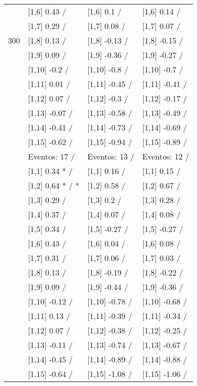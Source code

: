 \begin{table}
\begin{tabular}[t]{llll}
 & {}[1,6] 0.43  / & {}[1,6] 0.1  / & {}[1,6] 0.14  /\\
 & {}[1,7] 0.29  / & {}[1,7] 0.08  / & {}[1,7] 0.07  /\\
300 & {}[1,8] 0.13  / & {}[1,8] -0.13  / & {}[1,8] -0.15  /\\
\addlinespace
 & {}[1,9] 0.09  / & {}[1,9] -0.36  / & {}[1,9] -0.27  /\\
 & {}[1,10] -0.2  / & {}[1,10] -0.8  / & {}[1,10] -0.7  /\\
 & {}[1,11] 0.01  / & {}[1,11] -0.45  / & {}[1,11] -0.41  /\\
 & {}[1,12] 0.07  / & {}[1,12] -0.3  / & {}[1,12] -0.17  /\\
 & {}[1,13] -0.07  / & {}[1,13] -0.58  / & {}[1,13] -0.49  /\\
\addlinespace
 & {}[1,14] -0.41  / & {}[1,14] -0.73  / & {}[1,14] -0.69  /\\
 & {}[1,15] -0.62  / & {}[1,15] -0.94  / & {}[1,15] -0.89  /\\
 & Eventos:  17 / & Eventos:  13 / & Eventos:  12 /\\
 & {}[1,1] 0.34 * / & {}[1,1] 0.16  / & {}[1,1] 0.15  /\\
 & {}[1,2] 0.64 * / * & {}[1,2] 0.58  / & {}[1,2] 0.67  /\\
\addlinespace
 & {}[1,3] 0.29  / & {}[1,3] 0.2  / & {}[1,3] 0.28  /\\
 & {}[1,4] 0.37  / & {}[1,4] 0.07  / & {}[1,4] 0.08  /\\
 & {}[1,5] 0.34  / & {}[1,5] -0.27  / & {}[1,5] -0.27  /\\
 & {}[1,6] 0.43  / & {}[1,6] 0.04  / & {}[1,6] 0.08  /\\
 & {}[1,7] 0.31  / & {}[1,7] 0.06  / & {}[1,7] 0.03  /\\
\addlinespace
500 & {}[1,8] 0.13  / & {}[1,8] -0.19  / & {}[1,8] -0.22  /\\
 & {}[1,9] 0.09  / & {}[1,9] -0.44  / & {}[1,9] -0.36  /\\
 & {}[1,10] -0.12  / & {}[1,10] -0.78  / & {}[1,10] -0.68  /\\
 & {}[1,11] 0.13  / & {}[1,11] -0.39  / & {}[1,11] -0.34  /\\
 & {}[1,12] 0.07  / & {}[1,12] -0.38  / & {}[1,12] -0.25  /\\
\addlinespace
 & {}[1,13] -0.11  / & {}[1,13] -0.74  / & {}[1,13] -0.67  /\\
 & {}[1,14] -0.45  / & {}[1,14] -0.89  / & {}[1,14] -0.88  /\\
 & {}[1,15] -0.64  / & {}[1,15] -1.08  / & {}[1,15] -1.06  /\\
\bottomrule
\end{tabular}
\end{table}
